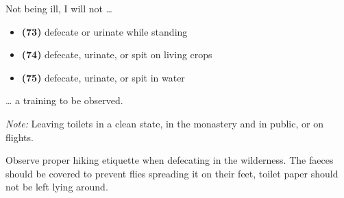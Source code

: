 Not being ill, I will not \ldots{}

\begin{itemize}
\tightlist
\item
  \textbf{(73)} defecate or urinate while standing
\item
  \textbf{(74)} defecate, urinate, or spit on living crops
\item
  \textbf{(75)} defecate, urinate, or spit in water
\end{itemize}

\ldots{} a training to be observed.

\emph{Note:} Leaving toilets in a clean state, in the monastery and in
public, or on flights.

Observe proper hiking etiquette when defecating in the wilderness. The
faeces should be covered to prevent flies spreading it on their feet,
toilet paper should not be left lying around.

